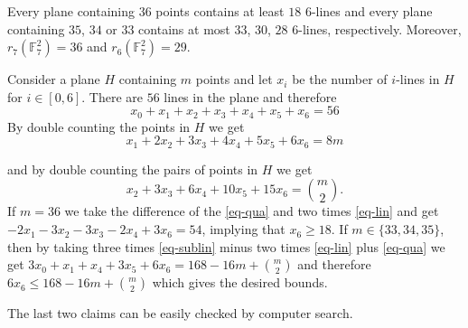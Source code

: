 \documentclass[10pt,a4paper]{amsart}
\begin{document}
\begin{claim}
Every plane containing $36$ points contains at least $18$ $6$-lines and every plane containing $35$, $34$ or $33$ contains at most $33$, $30$, $28$ $6$-lines, respectively.
Moreover, $r_7(\mathbb{F}_7^2)=36$ and $r_6(\mathbb{F}_7^2)=29$.
\end{claim}

\begin{proofofclaim}
Consider a plane $H$ containing $m$ points and let $x_i$ be the number of $i$-lines in $H$ for $i\in [0,6]$. There are $56$ lines in the plane and therefore 
\begin{equation}\label{eq-sublin}
x_0+x_1+x_2+x_3+x_4+x_5+x_6=56
\end{equation}
By double counting the points in $H$ we get 
\begin{equation}\label{eq-lin}
x_1+2x_2+3x_3+4x_4+5x_5+6x_6=8m
\end{equation}

and by double counting the pairs of points in $H$ we get 
\begin{equation}\label{eq-qua}
x_2+3x_3+6x_4+10x_5+15x_6=\binom{m}{2}.
\end{equation}
If $m=36$ 
we take the difference of the \eqref{eq-qua} and two times \eqref{eq-lin} and get $-2x_1-3x_2-3x_3-2x_4+3x_6=54$, implying that $x_6\geq 18$.
If $m\in\{33,34,35\}$, then by taking three times \eqref{eq-sublin} minus two times \eqref{eq-lin} plus \eqref{eq-qua} we get $3x_0+x_1+x_4+3x_5+6x_6=168-16m+\binom{m}{2}$ and therefore $6x_6\leq168-16m+\binom{m}{2}$ which gives the desired bounds.

The last two claims can be easily checked by computer search.
\end{proofofclaim}
\end{document}
